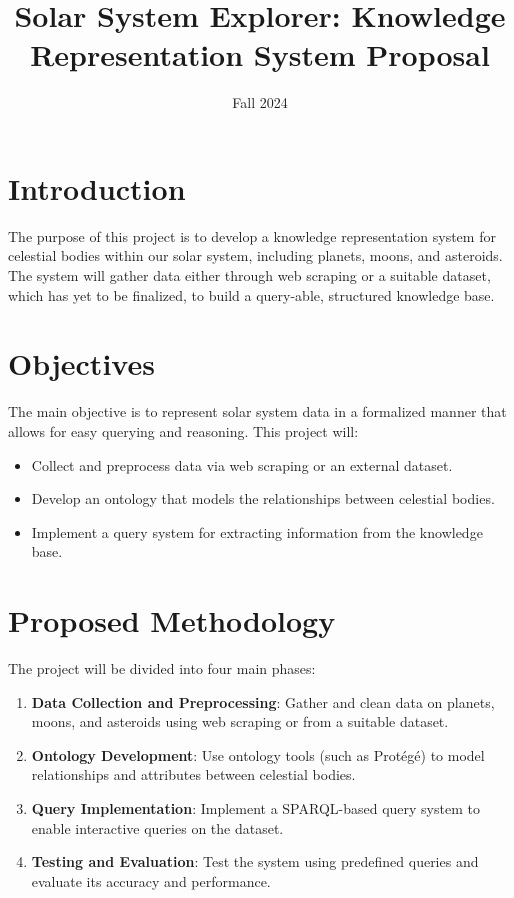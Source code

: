\documentclass{article}
\title{Solar System Explorer: Knowledge Representation System Proposal}
\author{}
\date{Fall 2024}
\begin{document}
\maketitle


\section{Introduction}
The purpose of this project is to develop a knowledge representation system for celestial bodies within our solar system, including planets, moons, and asteroids. The system will gather data either through web scraping or a suitable dataset, which has yet to be finalized, to build a query-able, structured knowledge base.

\section{Objectives}
The main objective is to represent solar system data in a formalized manner that allows for easy querying and reasoning. This project will:
\begin{itemize}
    \item Collect and preprocess data via web scraping or an external dataset.
    \item Develop an ontology that models the relationships between celestial bodies.
    \item Implement a query system for extracting information from the knowledge base.
\end{itemize}

\section{Proposed Methodology}
The project will be divided into four main phases:
\begin{enumerate}
    \item \textbf{Data Collection and Preprocessing}: Gather and clean data on planets, moons, and asteroids using web scraping or from a suitable dataset.
    \item \textbf{Ontology Development}: Use ontology tools (such as Protégé) to model relationships and attributes between celestial bodies.
    \item \textbf{Query Implementation}: Implement a SPARQL-based query system to enable interactive queries on the dataset.
    \item \textbf{Testing and Evaluation}: Test the system using predefined queries and evaluate its accuracy and performance.
\end{enumerate}
\end{document}
